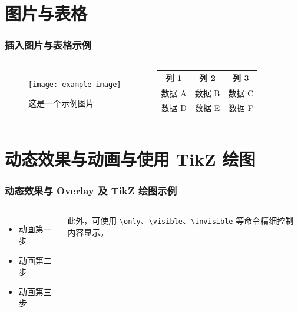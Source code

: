 \documentclass[aspectratio=169]{beamer}
\begin{document}
\section{图片与表格}
\begin{frame}
    \frametitle{插入图片与表格示例}
    \begin{columns}[T] %
            \begin{figure}
                \centering
                \texttt{[image: example-image]} %
                \caption{这是一个示例图片}
            \end{figure}
            \begin{center}
            \begin{tabular}{|c|c|c|}
                \hline
                列 1 & 列 2 & 列 3 \\
                \hline
                数据 A & 数据 B & 数据 C \\
                \hline
                数据 D & 数据 E & 数据 F \\
                \hline
            \end{tabular}
            \end{center}
    \end{columns}
\end{frame}

\section{动态效果与动画与使用 TikZ 绘图}
\begin{frame}[fragile]
    \frametitle{动态效果与 Overlay 及 TikZ 绘图示例}
    \begin{columns}[T] %
        \begin{itemize}
            \item 动画第一步
            \item 动画第二步
            \item 动画第三步
        \end{itemize}
        此外，可使用 \verb|\only|、\verb|\visible|、\verb|\invisible| 等命令精细控制内容显示。
        
    \end{columns}
\end{frame}
\end{document}
